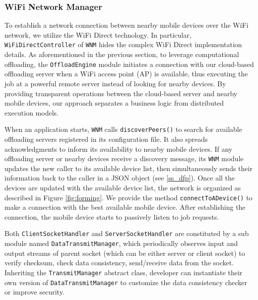 \documentclass{sig-alternate}[10pt]
\begin{document}
\subsubsection{WiFi Network Manager}
To establish a network connection between nearby mobile devices over the WiFi network, we utilize the WiFi Direct technology. In particular, \texttt{WiFiDirectController} of \texttt{WNM} hides the complex WiFi Direct implementation details. As aforementioned in the previous section, to leverage computational offloading, the \texttt{OffloadEngine} module initiates a connection with our cloud-based offloading server when a WiFi access point (AP) is available, thus executing the job at a powerful remote server instead of looking for nearby devices. By providing transparent operations between the cloud-based server and nearby mobile devices, our approach separates a business logic from distributed execution models.

When an application starts, \texttt{WNM} calls \texttt{discoverPeers()} to search for available offloading servers registered in its configuration file. It also spreads acknowledgments to inform its availability to nearby mobile devices. If any offloading server or nearby devices receive a discovery message, its \texttt{WNM} module updates the new caller to its available device list, then simultaneously sends their information back to the caller in a JSON object (see \ref{ss_dfp}). Once all the devices are updated with the available device list, the network is organized as described in Figure \ref{fig:forming}. We provide the method \texttt{connectToADevice()} to make a connection with the best available mobile device. After establishing the connection, the mobile device starts to passively listen to job requests.


Both \texttt{ClientSocketHandler} and \texttt{ServerSocketHandler} are constituted by a sub module named \texttt{DataTransmitManager}, which periodically observes input and output streams of parent socket (which can be either server or client socket) to verify checksum, check data consistency, send/receive data from the socket. Inheriting the \texttt{TransmitManager} abstract class, developer can instantiate their own version of \texttt{DataTransmitManager} to customize the data consistency checker or improve security. 
\end{document}
